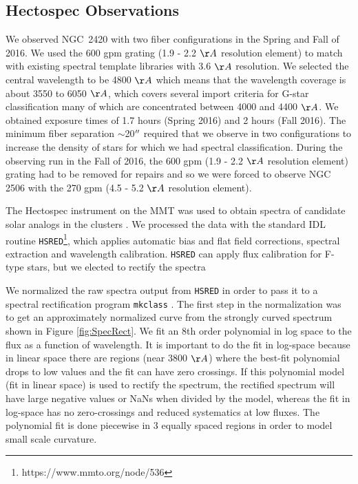 \documentclass{aastex6}
\begin{document}
\subsection{Hectospec Observations}
We observed NGC~2420 with two fiber configurations in the Spring and Fall of 2016.
We used the 600 gpm grating (1.9 - 2.2 $\AA$ resolution element) to match with existing spectral template libraries with 3.6 $\AA$ resolution.
We selected the central wavelength to be 4800 $\AA$ which means that the wavelength coverage is about 3550 to 6050 $\AA$, which covers several import criteria for G-star classification many of which are concentrated between 4000 and 4400 $\AA$.
We obtained exposure times of 1.7 hours (Spring 2016) and 2 hours (Fall 2016).
The minimum fiber separation $\sim$20$\mbox{$^{\prime\prime}$}$ required that we observe in two configurations to increase the density of stars for which we had spectral classification.
During the observing run in the Fall of 2016, the 600 gpm (1.9 - 2.2 $\AA$ resolution element) grating had to be removed for repairs and so we were forced to observe NGC 2506 with the 270 gpm (4.5 - 5.2 $\AA$ resolution element).

The Hectospec instrument on the MMT \citep{fabricant2005hectospec,mink2007hectoFibers} was used to obtain spectra of candidate solar analogs in the clusters .
We processed the data with the standard IDL routine \texttt{HSRED}\footnote{https://www.mmto.org/node/536}, which applies automatic bias and flat field corrections, spectral extraction and wavelength calibration.
\texttt{HSRED} can apply flux calibration for F-type stars, but we elected to rectify the spectra 

We normalized the raw spectra output from \texttt{HSRED} in order to pass it to a spectral rectification program \texttt{mkclass} \citep{gray2014classification}.
The first step in the normalization was to get an approximately normalized curve from the strongly curved spectrum shown in Figure \ref{fig:SpecRect}.
We fit an 8th order polynomial in log space to the flux as a function of wavelength.
It is important to do the fit in log-space because in linear space there are regions (near 3800 $\AA$) where the best-fit polynomial drops to low values and the fit can have zero crossings.
If this polynomial model (fit in linear space) is used to rectify the spectrum, the rectified spectrum will have large negative values or NaNs when divided by the model, whereas the fit in log-space has no zero-crossings and reduced systematics at low fluxes.
The polynomial fit is done piecewise in 3 equally spaced regions in order to model small scale curvature.
\end{document}
